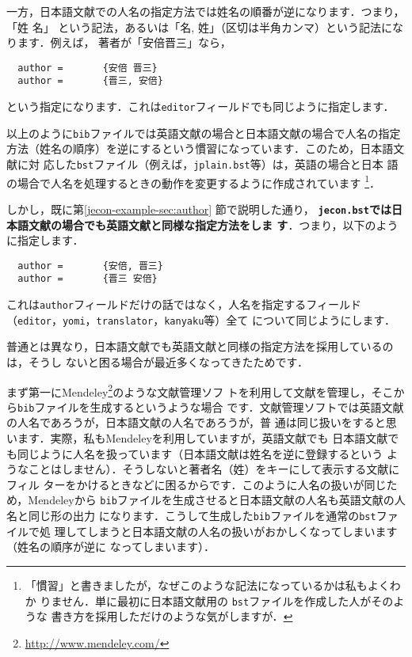 \documentclass[a4j,10pt]{jarticle}
\begin{document}
一方，日本語文献での人名の指定方法では姓名の順番が逆になります．つまり，「姓 名」
という記法，あるいは「名, 姓」（区切は半角カンマ）という記法になります．例えば，
著者が「安倍晋三」なら，
\begin{screen}
 \begin{verbatim}
  author =       {安倍 晋三}
  author =       {晋三, 安倍}
 \end{verbatim}
\end{screen}
という指定になります．これは\texttt{editor}フィールドでも同じように指定します．
\vspace*{1em}

以上のように\texttt{bib}ファイルでは英語文献の場合と日本語文献の場合で人名の指定
方法（姓名の順序）を逆にするという慣習になっています．このため，日本語文献に対
応した\texttt{bst}ファイル（例えば，\texttt{jplain.bst}等）は，英語の場合と日本
語の場合で人名を処理するときの動作を変更するように作成されています
\footnote{「慣習」と書きましたが，なぜこのような記法になっているかは私もよくわか
りません．単に最初に日本語文献用の \texttt{bst}ファイルを作成した人がそのような
書き方を採用しただけのような気がしますが．}．\vspace*{1em}

しかし，既に第\ref{jecon-example-sec:author} 節で説明した通り，
\textbf{\texttt{jecon.bst}では日本語文献の場合でも英語文献と同様な指定方法をしま
す}．つまり，以下のように指定します．
\begin{screen}
 \begin{verbatim}
  author =       {安倍, 晋三}
  author =       {晋三 安倍}
 \end{verbatim}
\end{screen}

これは\texttt{author}フィールドだけの話ではなく，人名を指定するフィールド
（\texttt{editor}，\texttt{yomi}，\texttt{translator}，\texttt{kanyaku}等）全て
について同じようにします．

\vspace*{1em}
普通とは異なり，日本語文献でも英語文献と同様の指定方法を採用しているのは，そうし
ないと困る場合が最近多くなってきたためです．

まず第一にMendeley\footnote{\url{http://www.mendeley.com/}}のような文献管理ソフ
トを利用して文献を管理し，そこから\texttt{bib}ファイルを生成するというような場合
です．文献管理ソフトでは英語文献の人名であろうが，日本語文献の人名であろうが，普
通は同じ扱いをすると思います．実際，私もMendeleyを利用していますが，英語文献でも
日本語文献でも同じように人名を扱っています（日本語文献は姓名を逆に登録するという
ようなことはしません）．そうしないと著者名（姓）をキーにして表示する文献にフィル
ターをかけるときなどに困るからです．このように人名の扱いが同じため，Mendeleyから
\texttt{bib}ファイルを生成させると日本語文献の人名も英語文献の人名と同じ形の出力
になります．こうして生成した\texttt{bib}ファイルを通常の\texttt{bst}ファイルで処
理してしまうと日本語文献の人名の扱いがおかしくなってしまいます（姓名の順序が逆に
なってしまいます）．\vspace*{1em}
\end{document}
